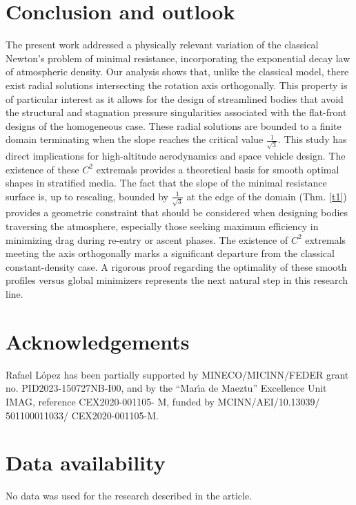 \documentclass[preprint,11pt]{elsarticle}
\theoremstyle{definition}
\begin{document}
  

 \section{Conclusion and outlook}
 
 The present work addressed a physically relevant variation of the classical Newton's problem of minimal resistance, incorporating the exponential decay law of atmospheric density.  Our analysis shows that, unlike the classical model, there exist radial solutions intersecting the rotation axis orthogonally. This property is of particular interest as it allows for the design of streamlined bodies that avoid the structural and stagnation pressure singularities associated with the flat-front designs of the homogeneous case.  These radial solutions  are bounded to a finite domain  terminating when the slope reaches the critical value $ \frac{1}{\sqrt{3}}$. This   study   has direct implications for high-altitude aerodynamics and space vehicle design.  The existence of these $C^2$ extremals provides a theoretical basis for smooth optimal shapes in stratified media.  The fact that the slope of the minimal resistance surface is, up to rescaling, bounded by $\frac{1}{\sqrt{3}}$ at the edge of the domain (Thm.  \ref{t1}) provides a   geometric constraint that should be considered when designing bodies traversing the atmosphere, especially those seeking maximum efficiency in minimizing drag during re-entry or ascent phases.  The existence of $C^2$ extremals meeting the axis orthogonally marks a significant departure from the classical constant-density case. A rigorous proof regarding the optimality of these smooth profiles versus global minimizers represents the next natural step in this research line.
  
 

 \section*{Acknowledgements} Rafael L\'opez has been partially supported by MINECO/MICINN/FEDER grant no. PID2023-150727NB-I00, and by the ``Mar\'{\i}a de Maeztu'' Excellence Unit IMAG, reference CEX2020-001105- M, funded by MCINN/AEI/10.13039/ 501100011033/ CEX2020-001105-M.


 \section*{Data availability}  No data was used for the research described in the article.
\end{document}
